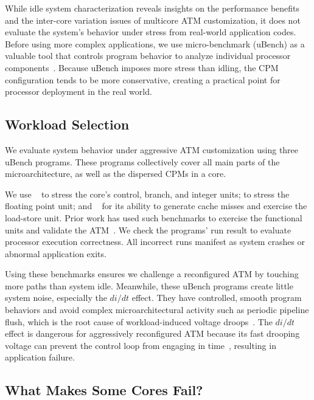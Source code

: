 While idle system characterization reveals insights on the performance benefits and the inter-core variation issues of multicore ATM customization, it does not evaluate the system's behavior under stress from real-world application codes. Before using more complex applications, we use micro-benchmark (uBench) as a valuable tool that controls program behavior to analyze individual processor components~\cite{papadimitriou2018micro}. Because uBench imposes more stress than idling, the CPM configuration tends to be more conservative, creating a practical point for processor deployment in the real world.

\subsection{Workload Selection}
\label{sec:process:ubench_benchmarks}

We evaluate system behavior under aggressive ATM customization using three uBench programs. These programs collectively cover all main parts of the microarchitecture, as well as the dispersed CPMs in a core. 

We use ~\cite{coremark} to stress the core's control, branch, and integer units;  to stress the floating point unit; and ~\cite{stream} for its ability to generate cache misses and exercise the load-store unit. Prior work has used such benchmarks to exercise the functional units and validate the ATM~\cite{lefurgy2011active, lefurgy2013active}. We check the programs' run result to evaluate processor execution correctness. All incorrect runs manifest as system crashes or abnormal application exits.

Using these benchmarks ensures we challenge a reconfigured ATM by touching more paths than system idle. Meanwhile, these uBench programs create little system noise, especially the $di/dt$ effect. They have controlled, smooth program behaviors and avoid complex microarchitectural activity such as periodic pipeline flush, which is the root cause of workload-induced voltage droops~\cite{grochowski2002microarchitectural,powell2003pipeline,reddi2009voltage,reddi2010voltage,miller2012vrsync}. The $di/dt$ effect is dangerous for aggressively reconfigured ATM because its fast drooping voltage can prevent the control loop from engaging in time~\cite{vezyrtzis2018droop}, resulting in application failure. 

\subsection{What Makes Some Cores Fail?}
\label{sec:process:ubench_profiling}


